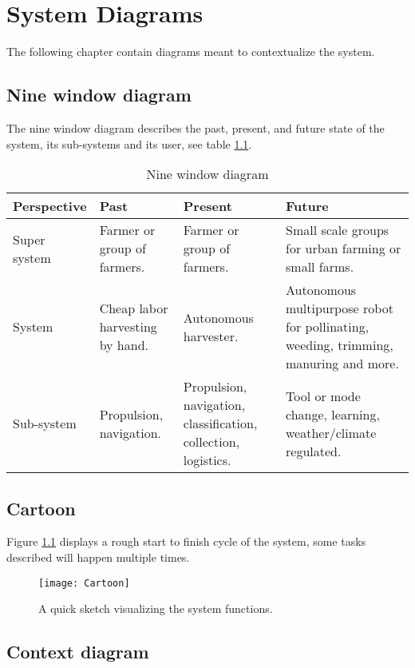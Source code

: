 \documentclass[%
oneside,    %
project,    %
nosummary   %
]{USN-MSc}
\begin{document}
\chapter{System Diagrams}
\label{ch:diagrams}
The following chapter contain diagrams meant to contextualize the system.

\section{Nine window diagram}
\label{sec:nineWindow}
The nine window diagram describes the past, present, and future state of the system, its sub-systems and its user, see table \ref{tab:nineWindow}.
\begin{table}[!ht]
  \caption{Nine window diagram}
   \centering
    \begin{tabular}{ | m{3cm} | m{3cm} | m{3cm} | m{5cm} |}
     \hline
     Perspective & Past & Present & Future \\ \hline
     Super system & Farmer or group of farmers. & Farmer or group of farmers. 
     & Small scale groups for urban farming or small farms. \\ \hline
     System & Cheap labor harvesting by hand. & Autonomous harvester. 
     & Autonomous multipurpose robot for pollinating, weeding, trimming, manuring and more. \\ \hline
     Sub-system & Propulsion, navigation. & Propulsion, navigation, classification, collection, logistics. 
     & Tool or mode change, learning, weather/climate regulated. \\ \hline
     \end{tabular}
     \label{tab:nineWindow}
 \end{table}

\section{Cartoon}
\label{sec:cartoon}

Figure \ref{fig:cartoon} displays a rough start to finish cycle of the system, some tasks described will happen multiple times.

\begin{figure}[!ht]
  \centering
  \texttt{[image: Cartoon]}
  \caption{A quick sketch visualizing the system functions.}
  \label{fig:cartoon}
\end{figure}

\section{Context diagram}
\label{sec:contextDiagram}
\end{document}
